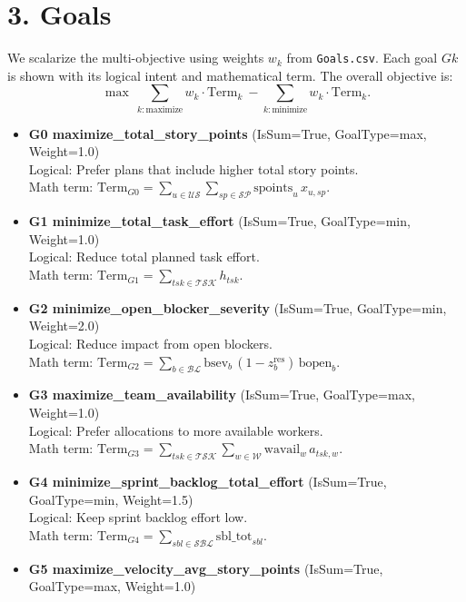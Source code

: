 \documentclass[a4paper,11pt]{article}
\begin{document}
\section{3. Goals}
We scalarize the multi-objective using weights $w_k$ from \texttt{Goals.csv}. Each goal $Gk$ is shown with its logical intent and mathematical term. The overall objective is:
\[
\max\ \sum_{k:\text{maximize}} w_k \cdot \text{Term}_k\ - \sum_{k:\text{minimize}} w_k \cdot \text{Term}_k.
\]
\begin{itemize}[leftmargin=2.2em]
  \item \textbf{G0 maximize\_total\_story\_points} (IsSum=True, GoalType=max, Weight=1.0)\\
  Logical: Prefer plans that include higher total story points.\\
  Math term: $\displaystyle \text{Term}_{G0}=\sum_{u\in\mathcal{US}}\sum_{sp\in\mathcal{SP}} \text{spoints}_{u}\, x_{u,sp}$.
  \item \textbf{G1 minimize\_total\_task\_effort} (IsSum=True, GoalType=min, Weight=1.0)\\
  Logical: Reduce total planned task effort.\\
  Math term: $\displaystyle \text{Term}_{G1}=\sum_{tsk\in\mathcal{TSK}} h_{tsk}$.
  \item \textbf{G2 minimize\_open\_blocker\_severity} (IsSum=True, GoalType=min, Weight=2.0)\\
  Logical: Reduce impact from open blockers.\\
  Math term: $\displaystyle \text{Term}_{G2}=\sum_{b\in\mathcal{BL}} \text{bsev}_{b}\,(1-z^{\text{res}}_{b})\,\text{bopen}_{b}$.
  \item \textbf{G3 maximize\_team\_availability} (IsSum=True, GoalType=max, Weight=1.0)\\
  Logical: Prefer allocations to more available workers.\\
  Math term: $\displaystyle \text{Term}_{G3}=\sum_{tsk\in\mathcal{TSK}}\sum_{w\in\mathcal{W}} \text{wavail}_{w}\, a_{tsk,w}$.
  \item \textbf{G4 minimize\_sprint\_backlog\_total\_effort} (IsSum=True, GoalType=min, Weight=1.5)\\
  Logical: Keep sprint backlog effort low.\\
  Math term: $\displaystyle \text{Term}_{G4}=\sum_{sbl\in\mathcal{SBL}} \text{sbl\_tot}_{sbl}$.
  \item \textbf{G5 maximize\_velocity\_avg\_story\_points} (IsSum=True, GoalType=max, Weight=1.0)\\

\end{itemize}
\end{document}

